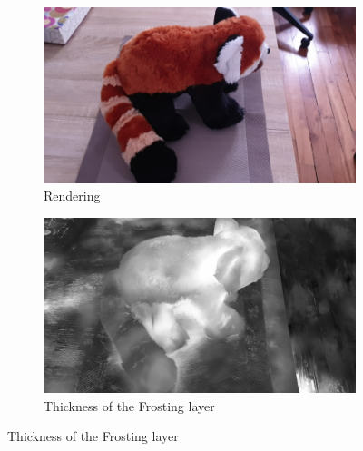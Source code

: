 \begin{figure}[h]
  \centering
  
  
   \begin{subfigure}{0.49\linewidth}
  \includegraphics[width=0.99\linewidth]{images/renders/panda1_rgb_166.jpg}
  \caption{Rendering}
  \end{subfigure}
  \hfill
  \begin{subfigure}{0.49\linewidth}
  \includegraphics[width=0.99\linewidth]{images/frosting_size/panda1_size_166.jpg}
  \caption{Thickness of the Frosting layer}
  \end{subfigure}
  

\end{figure}
